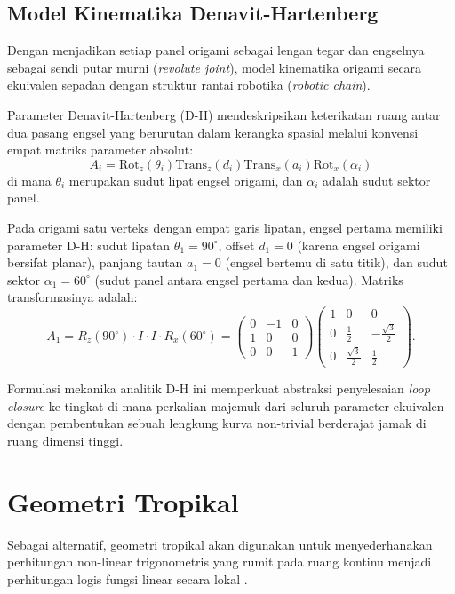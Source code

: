 \subsection{Model Kinematika Denavit-Hartenberg}
Dengan menjadikan setiap panel origami sebagai lengan tegar dan engselnya sebagai sendi putar murni (\textit{revolute joint}), model kinematika origami secara ekuivalen sepadan dengan struktur rantai robotika (\textit{robotic chain}). 
\begin{definisi}
  Parameter Denavit-Hartenberg (D-H) mendeskripsikan keterikatan ruang antar dua pasang engsel yang berurutan dalam kerangka spasial melalui konvensi empat matriks parameter absolut:
  \[
    A_i = \text{Rot}_z(\theta_i) \text{Trans}_z(d_i) \text{Trans}_x(a_i) \text{Rot}_x(\alpha_i)
  \]
  di mana $\theta_i$ merupakan sudut lipat engsel origami, dan $\alpha_i$ adalah sudut sektor panel.
\end{definisi}

\begin{contoh}
  Pada origami satu verteks dengan empat garis lipatan, engsel pertama memiliki parameter D-H: sudut lipatan $\theta_1 = 90^\circ$, offset $d_1 = 0$ (karena engsel origami bersifat planar), panjang tautan $a_1 = 0$ (engsel bertemu di satu titik), dan sudut sektor $\alpha_1 = 60^\circ$ (sudut panel antara engsel pertama dan kedua). Matriks transformasinya adalah:
  \[
    A_1 = R_z(90^\circ) \cdot I \cdot I \cdot R_x(60^\circ) = \begin{pmatrix} 0 & -1 & 0 \\ 1 & 0 & 0 \\ 0 & 0 & 1 \end{pmatrix} \begin{pmatrix} 1 & 0 & 0 \\ 0 & \frac{1}{2} & -\frac{\sqrt{3}}{2} \\ 0 & \frac{\sqrt{3}}{2} & \frac{1}{2} \end{pmatrix}.
  \]
\end{contoh}

Formulasi mekanika analitik D-H ini memperkuat abstraksi penyelesaian \textit{loop closure} ke tingkat di mana perkalian majemuk dari seluruh parameter ekuivalen dengan pembentukan sebuah lengkung kurva non-trivial berderajat jamak di ruang dimensi tinggi.

\section{Geometri Tropikal}
Sebagai alternatif, geometri tropikal akan digunakan untuk menyederhanakan perhitungan non-linear trigonometris yang rumit pada ruang kontinu menjadi perhitungan logis fungsi linear secara lokal \parencite{mikhalkin2006tropical}.

